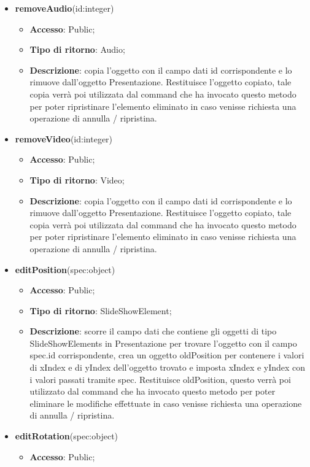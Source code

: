 {\begin{itemize}
			\item \textbf{removeAudio}(id:integer)
			\begin{itemize}
				\item \textbf{Accesso}: Public;
				\item \textbf{Tipo di ritorno}: Audio;
				\item \textbf{Descrizione}: copia l’oggetto con il campo dati id corrispondente e lo rimuove dall’oggetto Presentazione. Restituisce l’oggetto copiato, tale copia verrà poi utilizzata dal command che ha invocato questo metodo per poter ripristinare l'elemento eliminato in caso venisse richiesta una operazione di annulla / ripristina.
			\end{itemize}
			\item \textbf{removeVideo}(id:integer)
			\begin{itemize}
				\item \textbf{Accesso}: Public;
				\item \textbf{Tipo di ritorno}: Video;
				\item \textbf{Descrizione}: copia l’oggetto con il campo dati id corrispondente e lo rimuove dall’oggetto Presentazione. Restituisce l’oggetto copiato, tale copia verrà poi utilizzata dal command che ha invocato questo metodo per poter ripristinare l'elemento eliminato in caso venisse richiesta una operazione di annulla / ripristina.
			\end{itemize}
			\item \textbf{editPosition}(spec:object)
			\begin{itemize}
				\item \textbf{Accesso}: Public;
				\item \textbf{Tipo di ritorno}: SlideShowElement;
				\item \textbf{Descrizione}: scorre il campo dati che contiene gli oggetti di tipo SlideShowElements in Presentazione per trovare l’oggetto con il campo spec.id corrispondente, crea un oggetto oldPosition per contenere i valori di xIndex e di yIndex dell’oggetto trovato e imposta xIndex e yIndex con i valori passati tramite spec. Restituisce oldPosition, questo verrà poi utilizzato dal command che ha invocato questo metodo per poter eliminare le modifiche effettuate in caso venisse richiesta una operazione di annulla / ripristina.
			\end{itemize}
			\item \textbf{editRotation}(spec:object)
			\begin{itemize}
				\item \textbf{Accesso}: Public;

\end{itemize}
\end{itemize}}
